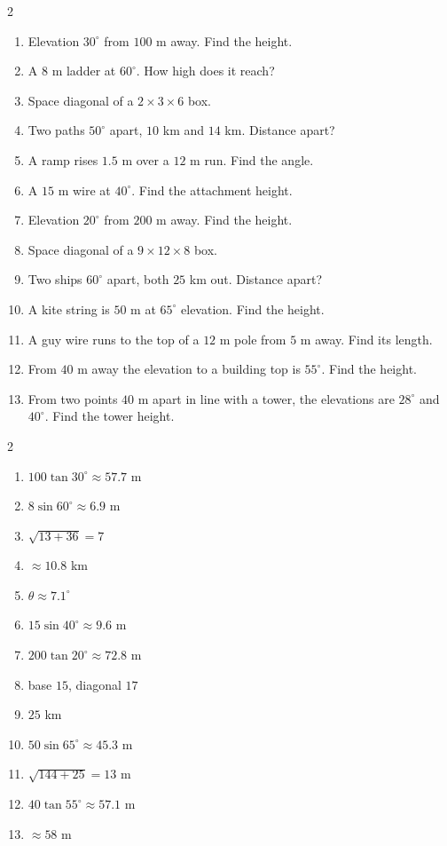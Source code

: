 \documentclass[11pt]{article}
\begin{document}
\begin{recapbox}
\begin{multicols}{2}
\small
\begin{enumerate}[leftmargin=*,itemsep=3pt]
  \item Elevation $30^\circ$ from $100$ m away. Find the height.
  \item A $8$ m ladder at $60^\circ$. How high does it reach?
  \item Space diagonal of a $2\times3\times6$ box.
  \item Two paths $50^\circ$ apart, $10$ km and $14$ km. Distance apart?
  \item A ramp rises $1.5$ m over a $12$ m run. Find the angle.
  \item A $15$ m wire at $40^\circ$. Find the attachment height.
  \item Elevation $20^\circ$ from $200$ m away. Find the height.
  \item Space diagonal of a $9\times12\times8$ box.
  \item Two ships $60^\circ$ apart, both $25$ km out. Distance apart?
  \item A kite string is $50$ m at $65^\circ$ elevation. Find the height.
  \item A guy wire runs to the top of a $12$ m pole from $5$ m away. Find its length.
  \item From $40$ m away the elevation to a building top is $55^\circ$. Find the height.
  \item From two points $40$ m apart in line with a tower, the elevations are $28^\circ$ and $40^\circ$. Find the tower height.
\end{enumerate}
\end{multicols}
\end{recapbox}

\begin{keybox}
\begin{multicols}{2}
\small
\begin{enumerate}[leftmargin=*,itemsep=3pt]
  \item $100\tan30^\circ\approx57.7$ m
  \item $8\sin60^\circ\approx6.9$ m
  \item $\sqrt{13+36}=7$
  \item $\approx10.8$ km
  \item $\theta\approx7.1^\circ$
  \item $15\sin40^\circ\approx9.6$ m
  \item $200\tan20^\circ\approx72.8$ m
  \item base $15$, diagonal $17$
  \item $25$ km
  \item $50\sin65^\circ\approx45.3$ m
  \item $\sqrt{144+25}=13$ m
  \item $40\tan55^\circ\approx57.1$ m
  \item $\approx58$ m
\end{enumerate}
\end{multicols}
\end{keybox}
\end{document}
